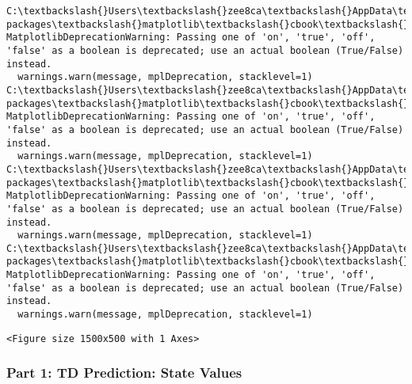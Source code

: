 \documentclass[11pt]{article}
\begin{document}
    \begin{Verbatim}[commandchars=\\\{\}]
C:\textbackslash{}Users\textbackslash{}zee8ca\textbackslash{}AppData\textbackslash{}Local\textbackslash{}Continuum\textbackslash{}anaconda3\textbackslash{}lib\textbackslash{}site-packages\textbackslash{}matplotlib\textbackslash{}cbook\textbackslash{}deprecation.py:107: MatplotlibDeprecationWarning: Passing one of 'on', 'true', 'off', 'false' as a boolean is deprecated; use an actual boolean (True/False) instead.
  warnings.warn(message, mplDeprecation, stacklevel=1)
C:\textbackslash{}Users\textbackslash{}zee8ca\textbackslash{}AppData\textbackslash{}Local\textbackslash{}Continuum\textbackslash{}anaconda3\textbackslash{}lib\textbackslash{}site-packages\textbackslash{}matplotlib\textbackslash{}cbook\textbackslash{}deprecation.py:107: MatplotlibDeprecationWarning: Passing one of 'on', 'true', 'off', 'false' as a boolean is deprecated; use an actual boolean (True/False) instead.
  warnings.warn(message, mplDeprecation, stacklevel=1)
C:\textbackslash{}Users\textbackslash{}zee8ca\textbackslash{}AppData\textbackslash{}Local\textbackslash{}Continuum\textbackslash{}anaconda3\textbackslash{}lib\textbackslash{}site-packages\textbackslash{}matplotlib\textbackslash{}cbook\textbackslash{}deprecation.py:107: MatplotlibDeprecationWarning: Passing one of 'on', 'true', 'off', 'false' as a boolean is deprecated; use an actual boolean (True/False) instead.
  warnings.warn(message, mplDeprecation, stacklevel=1)
C:\textbackslash{}Users\textbackslash{}zee8ca\textbackslash{}AppData\textbackslash{}Local\textbackslash{}Continuum\textbackslash{}anaconda3\textbackslash{}lib\textbackslash{}site-packages\textbackslash{}matplotlib\textbackslash{}cbook\textbackslash{}deprecation.py:107: MatplotlibDeprecationWarning: Passing one of 'on', 'true', 'off', 'false' as a boolean is deprecated; use an actual boolean (True/False) instead.
  warnings.warn(message, mplDeprecation, stacklevel=1)

    \end{Verbatim}

    
    \begin{verbatim}
<Figure size 1500x500 with 1 Axes>
    \end{verbatim}

    
    \subsubsection{Part 1: TD Prediction: State
Values}\label{part-1-td-prediction-state-values}
\end{document}
